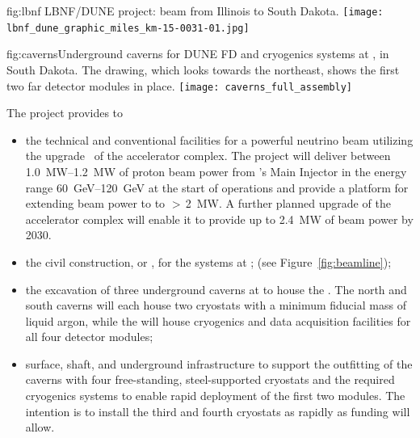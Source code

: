 \begin{dunefigure}{fig:lbnf}{ 	
LBNF/DUNE project: beam from Illinois to South Dakota.}
\texttt{[image: lbnf\_dune\_graphic\_miles\_km-15-0031-01.jpg]}
\end{dunefigure}

\begin{dunefigure}{fig:caverns}{Underground caverns for DUNE FD and cryogenics systems at , in South Dakota. The drawing, which looks towards the northeast, shows the first two far detector modules in place.}
\texttt{[image: caverns\_full\_assembly]}
\end{dunefigure}


The  project provides to 
\begin{itemize}
\item  the  technical and conventional facilities for a powerful neutrino beam utilizing the  upgrade~\cite{pip2-2013} of the  accelerator 
complex. The  project will deliver between \SIrange{1.0}{1.2}{MW} of proton beam power from 's Main Injector in the energy range  \SIrange{60}{120}{GeV} at the start of  operations and provide a platform for extending beam power to  to %
$>\,$\SI{2}{MW}. %
A further planned upgrade 
of the accelerator complex will enable it to provide up to \SI{2.4}{\MW} of beam power by 2030. 

\item  the civil construction, or , for the  systems at ; (see Figure~\ref{fig:beamline});

\item the excavation of three underground caverns at  to house the  . The north and south caverns will each house two cryostats with 
a minimum \nominalmodsize fiducial mass of liquid argon, while the  will house cryogenics and data acquisition facilities for all four detector modules;

\item surface, shaft, and underground infrastructure to support 
the outfitting of the caverns with four free-standing, steel-supported cryostats 
and the required cryogenics systems to enable rapid deployment of the first two \nominalmodsize {} modules. 
The intention is to install the third and fourth cryostats as rapidly as funding will 
allow.

\end{itemize}


